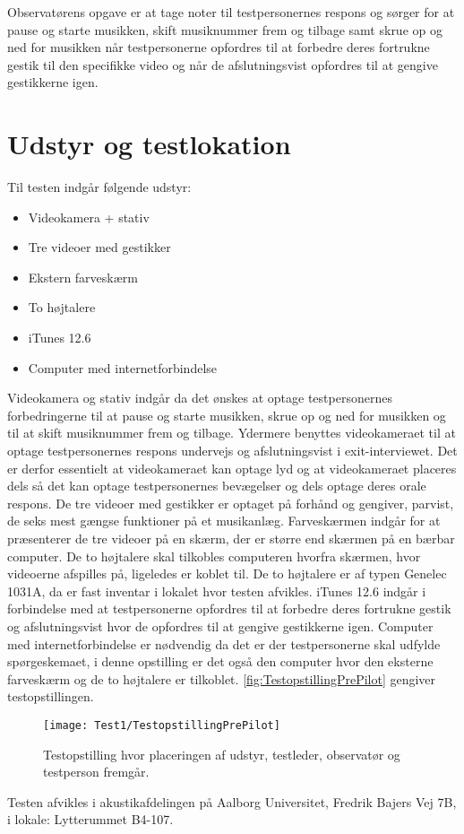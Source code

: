 Observatørens opgave er at tage noter til testpersonernes respons og sørger for at pause og starte musikken, skift musiknummer frem og tilbage samt skrue op og ned for musikken når testpersonerne opfordres til at forbedre deres fortrukne gestik til den specifikke video og når de afslutningsvist opfordres til at gengive gestikkerne igen. 

\section{Udstyr og testlokation}
\label{UdstyrOgTestlokationValgAfGestikker}
%
Til testen indgår følgende udstyr:
%
\begin{itemize}
  \item Videokamera + stativ
  \item Tre videoer med gestikker
  \item Ekstern farveskærm 
  \item To højtalere
  \item iTunes 12.6  
  \item Computer med internetforbindelse\blankline
\end{itemize}
% 
Videokamera og stativ indgår da det ønskes at optage testpersonernes forbedringerne til at pause og starte musikken, skrue op og ned for musikken og til at skift musiknummer frem og tilbage. Ydermere benyttes videokameraet til at optage testpersonernes respons undervejs og afslutningsvist i exit-interviewet. Det er derfor essentielt at videokameraet kan optage lyd og at videokameraet placeres dels så det kan optage testpersonernes bevægelser og dels optage deres orale respons. De tre videoer med gestikker er optaget på forhånd og gengiver, parvist, de seks mest gængse funktioner på et musikanlæg. Farveskærmen indgår for at præsenterer de tre videoer på en skærm, der er større end skærmen på en bærbar computer. De to højtalere skal tilkobles computeren hvorfra skærmen, hvor videoerne afspilles på, ligeledes er koblet til. De to højtalere er af typen Genelec 1031A, da er fast inventar i lokalet hvor testen afvikles. iTunes 12.6 indgår i forbindelse med at testpersonerne opfordres til at forbedre deres fortrukne gestik og afslutningsvist hvor de opfordres til at gengive gestikkerne igen. Computer med internetforbindelse er nødvendig da det er der testpersonerne skal udfylde spørgeskemaet, i denne opstilling er det også den computer hvor den eksterne farveskærm og de to højtalere er tilkoblet. \autoref{fig:TestopstillingPrePilot} gengiver testopstillingen.  
%
\begin{figure}[H]
	\centering
	\texttt{[image: Test1/TestopstillingPrePilot]}
	\caption{Testopstilling hvor placeringen af udstyr, testleder, observatør og testperson fremgår.}
	\label{fig:TestopstillingPrePilot}
\end{figure}
\noindent
% 
Testen afvikles i akustikafdelingen på Aalborg Universitet, Fredrik Bajers Vej 7B, i lokale: Lytterummet B4-107. 
%